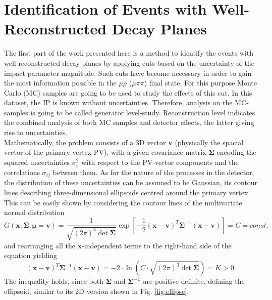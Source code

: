 \chapter{Identification of Events with Well-Reconstructed Decay Planes} %

\label{Chapter4} %


The first part of the work presented here is a method to identify the events with well-reconstructed decay planes by applying cuts based on the uncertainty of the impact parameter magnitude. Such cuts have become necessary in order to gain the most information possible in the $\mu\rho$ ($\mu\pi\pi$) final state. For this purpose Monte Carlo (MC) samples are going to be used to study the effects of this cut. In this dataset, the IP is known without uncertainties. Therefore, analysis on the MC-samples is going to be called generator level-study. Reconstruction level indicates the combined analysis of both MC samples and detector effects, the latter giving rise to uncertainties.\\
Mathematically, the problem consists of a 3D vector \textbf{v} (physically the spacial vector of the primary vertex PV), with a given covariance matrix $\boldsymbol{\Sigma}$ encoding the squared uncertainties $\sigma^2_i$ with respect to the PV-vector components and the correlations $\sigma_{ij}$ between them. As for the nature of the processes in the detector, the distribution of these uncertainties can be assumed to be Gaussian, its contour lines describing three-dimensional ellipsoids centred around the primary vertex. This can be easily shown by considering the contour lines of the multivariate normal distribution
\begin{equation}
	G(\boldsymbol{x};\boldsymbol{\Sigma},\boldsymbol{\mu}=\boldsymbol{v}) = \frac{1}{\sqrt{(2\pi)^3\det\boldsymbol{\Sigma}}}\exp{\left[-\frac{1}{2}(\boldsymbol{x}-\boldsymbol{v})^T \boldsymbol{\Sigma}^{-1}(\boldsymbol{x}-\boldsymbol{v}) \right]} = C = const.
\end{equation}
and rearranging all the \textbf{x}-independent terms to the right-hand side of the equation yielding
\begin{equation}
	(\boldsymbol{x}-\boldsymbol{v})^T \boldsymbol{\Sigma}^{-1}(\boldsymbol{x}-\boldsymbol{v}) = -2\cdot\ln\left(C\cdot\sqrt{(2\pi)^3\det\boldsymbol{\Sigma}}\right)=K>0.
\end{equation}
The inequality holds, since both $\boldsymbol{\Sigma}$ and $\boldsymbol{\Sigma^{-1}}$ are positive definite, defining the ellipsoid, similar to its 2D version shown in Fig. \ref{fig:ellipse}.
